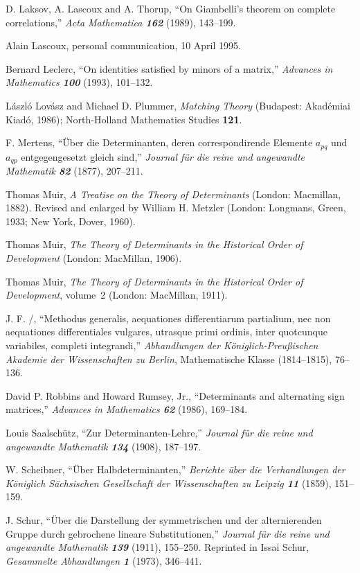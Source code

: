 {\bib
[\LLT]
D. Laksov, A. Lascoux and A. Thorup, ``On Giambelli's theorem on complete
correlations,'' {\sl Acta Mathematica\/ \bf162} (1989), 143--199.

\bib
[\Lasc] Alain Lascoux, personal communication, 10 April 1995.

\bib
[\Lec] Bernard Leclerc, ``On identities satisfied by minors of a matrix,''
{\sl Advances in Mathematics\/ \bf100} (1993), 101--132.

\bib
[\LP]
L\'aszl\'o Lov\'asz and Michael D. Plummer, {\sl Matching Theory\/} (Budapest:
Akad\'emiai Kiad\'o, 1986); North-Holland Mathematics Studies {\bf 121}.

\bib
[\Mert]
F. Mertens, ``\"Uber die Determinanten, deren correspondirende Elemente
$a_{pq}$ und~$a_{qp}$ ent\-gegen\-gesetzt gleich sind,'' 
{\sl Journal f\"ur die reine und angewandte Mathematik\/
\bf 82} (1877), 207--211.

\bib
[\Muirtreat]
Thomas Muir, {\sl A Treatise on the Theory of Determinants\/} (London:
Macmillan, 1882). Revised and enlarged by William H. Metzler (London:
Longmans, Green, 1933; New York, Dover, 1960).

\bib
[\Muir]
Thomas Muir, {\sl The Theory of Determinants in the Historical Order of
Development\/} (London: MacMillan, 1906).

\bib
[\Muirtwo]
Thomas Muir, {\sl The Theory of Determinants in the Historical Order of
Development}, volume~2 (London: MacMillan, 1911).

\bib
[\Pf]
J. F. \Pfaff/, ``Methodus generalis, aequationes differentiarum partialium, nec
non aequationes differentiales vulgares, utrasque primi ordinis, inter
quotcunque variabiles, completi integrandi,'' {\sl Abhandlungen der
K\"oniglich-Preu{\ss}ischen Akademie der Wissenschaften zu Berlin},
Mathematische Klasse (1814--1815), 76--136.

\bib
[\RR]
David P. Robbins and Howard Rumsey, Jr., ``Determinants and alternating sign
matrices,'' {\sl Advances in Mathematics\/ \bf 62} (1986), 169--184.

\bib
[\Saal]
Louis Saalsch\"utz, ``Zur Determinanten-Lehre,''
{\sl Journal f\"ur die reine und angewandte Mathematik\/
\bf 134} (1908), 187--197.

\bib
[\Scheib]
W. Scheibner, ``\"Uber Halbdeterminanten,'' {\sl Berichte \"uber die
Verhandlungen der K\"oniglich S\"achsischen Gesellschaft der Wissenschaften zu
Leipzig\/ \bf 11} (1859), 151--159.

\bib
[\Schur]
J. Schur, ``\"Uber die Darstellung der symmetrischen und der alternierenden
Gruppe durch gebrochene lineare Substitutionen,'' {\sl Journal f\"ur die reine
und angewandte Mathematik\/ \bf139} (1911), 155--250. Reprinted in Issai
Schur, {\sl Gesammelte Abhandlungen\/ \bf1} (1973), 346--441.

}
